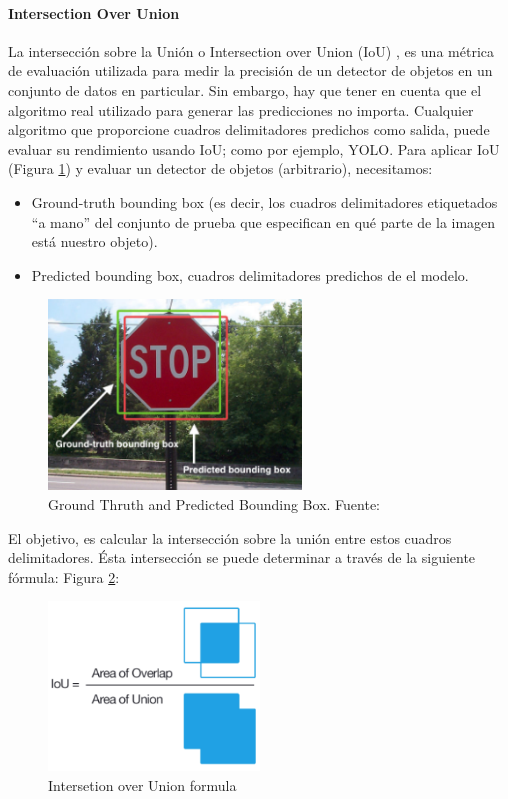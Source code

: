 \newpage
\paragraph{Intersection Over Union}
La intersección sobre la Unión o Intersection over Union (IoU) \cite{iou}, es una  métrica de evaluación utilizada para medir la precisión de un detector de objetos en un conjunto de datos en particular. Sin embargo, hay que tener  en cuenta que el algoritmo real utilizado para generar las predicciones no importa. Cualquier algoritmo que proporcione cuadros delimitadores predichos como salida, puede evaluar su rendimiento usando IoU; como por ejemplo, YOLO. Para aplicar IoU (Figura \ref{fig:iou 1}) y evaluar un detector de objetos (arbitrario), necesitamos:

\begin{itemize}
    \item Ground-truth bounding box (es decir, los cuadros delimitadores etiquetados ``a mano'' del conjunto de prueba que especifican en qué parte de la imagen está nuestro objeto).
    \item Predicted bounding box, cuadros delimitadores predichos de el modelo.
\end{itemize}

\begin{figure}[h!]
    \centering
    \includegraphics[width=0.6\textwidth]{img/iou-1.png}
    \caption{Ground Thruth and Predicted Bounding Box. Fuente:\cite{iou}}
    \label{fig:iou 1}
\end{figure}

El objetivo, es calcular la intersección sobre la unión entre estos cuadros delimitadores. Ésta intersección se puede determinar a través de la siguiente fórmula:  Figura \ref{fig:iou formula}:

\begin{figure}[h!]
    \centering
    \includegraphics[width=0.5\textwidth]{img/iou-2.png}
    \caption{Intersetion over Union formula}
    \label{fig:iou formula}
\end{figure}

